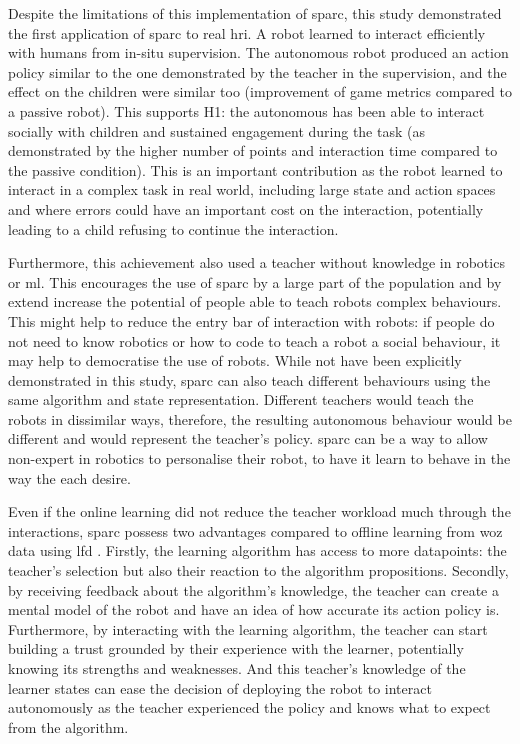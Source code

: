 Despite the limitations of this implementation of \gls{sparc}, this study demonstrated the first application of \gls{sparc} to real \gls{hri}. A robot learned to interact efficiently with humans from in-situ supervision.  The autonomous robot produced an action policy similar to the one demonstrated by the teacher in the supervision, and the effect on the children were similar too (improvement of game metrics compared to a passive robot). This supports H1: the autonomous has been able to interact socially with children and sustained engagement during the task (as demonstrated by the higher number of points and interaction time compared to the passive condition). This is an important contribution as the robot learned to interact in a complex task in real world, including large state and action spaces and where errors could have an important cost on the interaction, potentially leading to a child refusing to continue the interaction.

Furthermore, this achievement also used a teacher without knowledge in robotics or \gls{ml}. This encourages the use of \gls{sparc} by a large part of the population and by extend increase the potential of people able to teach robots complex behaviours. This might help to reduce the entry bar of interaction with robots: if people do not need to know robotics or how to code to teach a robot a social behaviour, it may help to democratise the use of robots. While not have been explicitly demonstrated in this study, \gls{sparc} can also teach different behaviours using the same algorithm and state representation. Different teachers would teach the robots in dissimilar ways, therefore, the resulting autonomous behaviour would be different and would represent the teacher's policy. \gls{sparc} can be a way to allow non-expert in robotics to personalise their robot, to have it learn to behave in the way the each desire.

Even if the online learning did not reduce the teacher workload much through the interactions, \gls{sparc} possess two advantages compared to offline learning from \gls{woz} data using \gls{lfd} \citep{sequeira2016discovering,liu2014train}. Firstly, the learning algorithm has access to more datapoints: the teacher's selection but also their reaction to the algorithm propositions. Secondly, by receiving feedback about the algorithm's knowledge, the teacher can create a mental model of the robot and have an idea of how accurate its action policy is. Furthermore, by interacting with the learning algorithm, the teacher can start building a trust grounded by their experience with the learner, potentially knowing its strengths and weaknesses. And this teacher's knowledge of the learner states can ease the decision of deploying the robot to interact autonomously as the teacher experienced the policy and knows what to expect from the algorithm.

